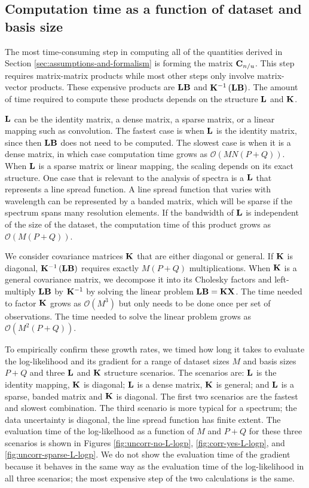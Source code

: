 \documentclass[manuscript]{aastex62}
\newcommand{\vx}[1]{{\bf {#1}}}
\begin{document}
\subsection{Computation time as a function of dataset and basis size}
\label{subsec:scaling}
The most time-consuming step in computing all of the quantities derived in Section \ref{sec:assumptions-and-formalism} is forming the matrix $\vx{C}_{n/u}$.
This step requires matrix-matrix products while most other steps only involve matrix-vector products.
These expensive products are $\vx{L}\vx{B}$ and $\vx{K}^{-1} \left(\vx{L} \vx{B}\right)$.
The amount of time required to compute these products depends on the structure $\vx{L}$ and $\vx{K}$.

$\vx{L}$ can be the identity matrix, a dense matrix, a sparse matrix, or a linear mapping such as convolution.
The fastest case is when $\vx{L}$ is the identity matrix, since then $\vx{L}\vx{B}$ does not need to be computed.
The slowest case is when it is a dense matrix, in which case computation time grows as $\mathcal{O}(MN(P+Q))$.
When $\vx{L}$ is a sparse matrix or linear mapping, the scaling depends on its exact structure.
One case that is relevant to the analysis of spectra is a $\vx{L}$ that represents a line spread function.
A line spread function that varies with wavelength can be represented by a banded matrix, which will be sparse if the spectrum spans many resolution elements.
If the bandwidth of $\vx{L}$ is independent of the size of the dataset, the computation time of this product grows as $\mathcal{O}(M(P+Q))$.

We consider covariance matrices $\vx{K}$ that are either diagonal or general.
If $\vx{K}$ is diagonal, $\vx{K}^{-1} \left(\vx{L} \vx{B}\right)$ requires exactly $M(P+Q)$ multiplications.
When $\vx{K}$ is a general covariance matrix, we decompose it into its Cholesky factors and left-multiply $\vx{L} \vx{B}$ by $\vx{K}^{-1}$ by solving the linear problem $\vx{\vx{L} \vx{B}} = \vx{K} \vx{X}$.
The time needed to factor $\vx{K}$ grows as $\mathcal{O}\left(M^3\right)$ but only needs to be done once per set of observations.
The time needed to solve the linear problem grows as $\mathcal{O}\left(M^2 (P+Q)\right)$.

To empirically confirm these growth rates, we timed how long it takes to evaluate the log-likelihood and its gradient for a range of dataset sizes $M$ and basis sizes $P+Q$ and three $\vx{L}$ and $\vx{K}$ structure scenarios.
The scenarios are: $\vx{L}$ is the identity mapping, $\vx{K}$ is diagonal; $\vx{L}$ is a dense matrix, $\vx{K}$ is general; and $\vx{L}$ is a sparse, banded matrix and $\vx{K}$ is diagonal.
The first two scenarios are the fastest and slowest combination.
The third scenario is more typical for a spectrum; the data uncertainty is diagonal, the line spread function has finite extent.
The evaluation time of the log-likelhood as a function of $M$ and $P+Q$ for these three scenarios is shown in Figures \ref{fig:uncorr-no-L-logp}, \ref{fig:corr-yes-L-logp}, and \ref{fig:uncorr-sparse-L-logp}.
We do not show the evaluation time of the gradient because it behaves in the same way as the evaluation time of the log-likelihood in all three scenarios; the most expensive step of the two calculations is the same.
\end{document}

